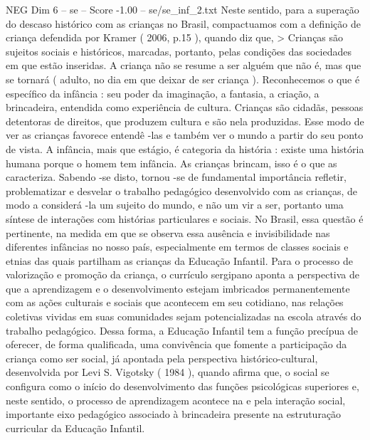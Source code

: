 \begin{textsample}{NEG Dim 6 – se – Score -1.00 – se/se\_inf\_2.txt}
Neste sentido, para a superação do descaso histórico com as crianças no Brasil, compactuamos com a definição de criança defendida por Kramer ( 2006, p.15 ), quando diz que, > Crianças são sujeitos sociais e históricos, marcadas, portanto, pelas condições das sociedades em que estão inseridas.
A criança não se resume a ser alguém que não é, mas que se tornará ( adulto, no dia em que deixar de ser criança ).
Reconhecemos o que é específico da infância : seu poder da imaginação, a fantasia, a criação, a brincadeira, entendida como experiência de cultura.
Crianças são cidadãs, pessoas detentoras de direitos, que produzem cultura e são nela produzidas.
Esse modo de ver as crianças favorece entendê -las e também ver o mundo a partir do seu ponto de vista.
A infância, mais que estágio, é categoria da história : existe uma história humana porque o homem tem infância.
As crianças brincam, isso é o que as caracteriza.
Sabendo -se disto, tornou -se de fundamental importância refletir, problematizar e desvelar o trabalho pedagógico desenvolvido com as crianças, de modo a considerá -la um sujeito do mundo, e não um vir a ser, portanto uma síntese de interações com histórias particulares e sociais.
No Brasil, essa questão é pertinente, na medida em que se observa essa ausência e invisibilidade nas diferentes infâncias no nosso país, especialmente em termos de classes sociais e etnias das quais partilham as crianças da Educação Infantil.
Para o processo de valorização e promoção da criança, o currículo sergipano aponta a perspectiva de que a aprendizagem e o desenvolvimento estejam imbricados permanentemente com as ações culturais e sociais que acontecem em seu cotidiano, nas relações coletivas vividas em suas comunidades sejam potencializadas na escola através do trabalho pedagógico.
Dessa forma, a Educação Infantil tem a função precípua de oferecer, de forma qualificada, uma convivência que fomente a participação da criança como ser social, já apontada pela perspectiva histórico-cultural, desenvolvida por Levi S.
Vigotsky ( 1984 ), quando afirma que, o social se configura como o início do desenvolvimento das funções psicológicas superiores e, neste sentido, o processo de aprendizagem acontece na e pela interação social, importante eixo pedagógico associado à brincadeira presente na estruturação curricular da Educação Infantil.

\end{textsample}
